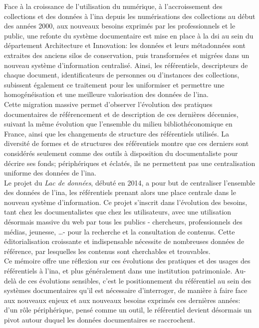 Face à la croissance de l'utilisation du numérique, à l'accroissement des collections et des données à l'\ac{ina} depuis les numérisations des collections au début des années 2000, aux nouveaux besoins exprimés par les professionnels et le public, une refonte du système documentaire est mise en place à la \ac{dsi} au sein du département \og Architecture et Innovation\fg{}: les données et leurs métadonnées sont extraites des anciens silos de conservation, puis transformées et migrées dans un nouveau système d'information centralisé. Ainsi, les référentiels, descripteurs de chaque document, identificateurs de personnes ou d'instances des collections, subissent également ce traitement pour les uniformiser et permettre une homogénéisation et une meilleure valorisation des données de l'\ac{ina}.\\

Cette migration massive permet d'observer l'évolution des pratiques documentaires de référencement et de description de ces dernières décennies, suivant la même évolution que l'ensemble du milieu bibliothéconomique en France, ainsi que les changements de structure des référentiels utilisés. La diversité de formes et de structures des référentiels montre que ces derniers sont considérés seulement comme des outils à disposition du documentaliste pour décrire ses fonds; périphériques et éclatés, ils ne permettent pas une centralisation uniforme des données de l'\ac{ina}.\\

Le projet du \textit{Lac de données}, débuté en 2014, a pour but de centraliser l'ensemble des données de l'\ac{ina}, les référentiels prenant alors une place centrale dans le nouveau système d'information. Ce projet s'inscrit dans l'évolution des besoins, tant chez les documentalistes que chez les utilisateurs, avec une utilisation désormais massive du web par tous les publics - chercheurs, professionnels des médias, jeunesse, \dots - pour la recherche et la consultation de contenus. Cette éditorialisation croissante et indispensable nécessite de nombreuses données de référence, par lesquelles les contenus sont cherchables et trouvables.\\

Ce mémoire offre une réflexion sur ces évolutions des pratiques et des usages des référentiels à l'\ac{ina}, et plus généralement dans une institution patrimoniale. Au-delà de ces évolutions sensibles, c'est le positionnement du référentiel au sein des systèmes documentaires qu'il est nécessaire d'interroger, de manière à faire face aux nouveaux enjeux et aux nouveaux besoins exprimés ces dernières années: d'un rôle périphérique, pensé comme un outil, le référentiel devient désormais un pivot autour duquel les données documentaires se raccrochent.\\

